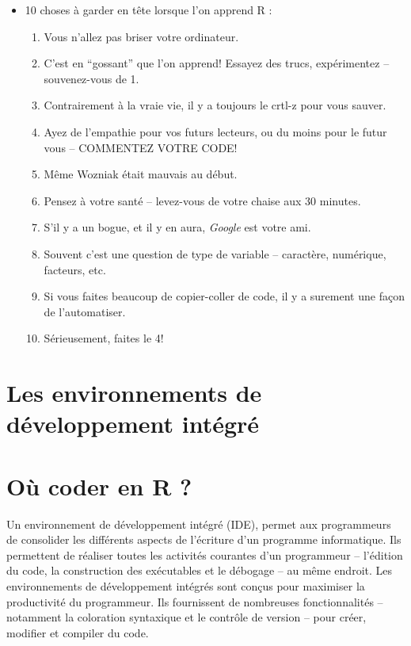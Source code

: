 \documentclass[
  letterpaper,
]{scrbook}
\providecommand{\tightlist}{%
  \setlength{\itemsep}{0pt}\setlength{\parskip}{0pt}}\usepackage{longtable,booktabs,array}
\begin{document}
\begin{itemize}
\tightlist
\item
  10 choses à garder en tête lorsque l'on apprend R :

  \begin{enumerate}
  \def\labelenumi{\arabic{enumi}.}
  \tightlist
  \item
    Vous n'allez pas briser votre ordinateur.
  \item
    C'est en ``gossant'' que l'on apprend! Essayez des trucs,
    expérimentez -- souvenez-vous de 1.
  \item
    Contrairement à la vraie vie, il y a toujours le crtl-z pour vous
    sauver.
  \item
    Ayez de l'empathie pour vos futurs lecteurs, ou du moins pour le
    futur vous -- COMMENTEZ VOTRE CODE!
  \item
    Même Wozniak était mauvais au début.
  \item
    Pensez à votre santé -- levez-vous de votre chaise aux 30 minutes.
  \item
    S'il y a un bogue, et il y en aura, \emph{Google} est votre ami.
  \item
    Souvent c'est une question de type de variable -- caractère,
    numérique, facteurs, etc.
  \item
    Si vous faites beaucoup de copier-coller de code, il y a surement
    une façon de l'automatiser.
  \item
    Sérieusement, faites le 4!
  \end{enumerate}
\end{itemize}

\hypertarget{les-environnements-de-duxe9veloppement-intuxe9gruxe9}{%
\section{Les environnements de développement
intégré}\label{les-environnements-de-duxe9veloppement-intuxe9gruxe9}}

\hypertarget{ouxf9-coder-en-r}{%
\section{Où coder en R ?}\label{ouxf9-coder-en-r}}

Un environnement de développement intégré (IDE), permet aux programmeurs
de consolider les différents aspects de l'écriture d'un programme
informatique. Ils permettent de réaliser toutes les activités courantes
d'un programmeur -- l'édition du code, la construction des exécutables
et le débogage -- au même endroit. Les environnements de développement
intégrés sont conçus pour maximiser la productivité du programmeur. Ils
fournissent de nombreuses fonctionnalités -- notamment la coloration
syntaxique et le contrôle de version -- pour créer, modifier et compiler
du code.
\end{document}
